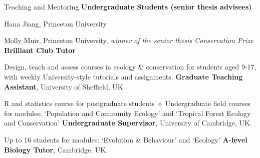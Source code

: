 \begin{rubric}{Teaching and Mentoring}
 \textbf{Undergraduate Students (senior thesis advisees)}
\par Hana Jiang, Princeton University
\par Molly Muir, Princeton University, \emph{winner of the senior thesis Conservation Prize}
 \textbf{Brilliant Club Tutor}
\par Design, teach and assess courses in ecology \& conservation for students aged 9-17, with weekly University-style tutorials and assignments.
\entry*[2014 -- 2018] \textbf{Graduate Teaching Assistant}, University of Sheffield, UK.
\par R and statistics course for postgraduate students $\diamond$ Undergraduate field courses for modules: `Population and Community Ecology' and `Tropical Forest Ecology and Conservation'
%
\entry*[2013 -- 2014] \textbf{Undergraduate Supervisor}, University of Cambridge, UK.
\par Up to 16 students for modules: `Evolution \& Behaviour' and  `Ecology'
\entry*[2013 -- 2014] \textbf{A-level Biology Tutor}, Cambridge, UK.

\end{rubric}